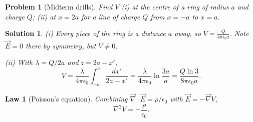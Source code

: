 \documentclass{article}
\newtheorem{law}{Law}
\newtheorem{problem}{Problem}
\newtheorem{solution}{Solution}
\begin{document}
\begin{problem}[Midterm drills]
    Find $V$ (i) at the centre of a ring of radius $a$ and charge $Q$; (ii) at $x = 2a$ for a line of charge $Q$ from $x = -a$ to $x = a$.
\end{problem}
\begin{solution}
    (i) Every piece of the ring is a distance $a$ away, so $V = \frac{Q}{4\pi\epsilon_0 a}$. Note $\vec{E} = 0$ there by symmetry, but $V \neq 0$.\par
    (ii) With $\lambda = Q/2a$ and $\mathfrak{r} = 2a - x'$,
    \[V = \frac{\lambda}{4\pi\epsilon_0}\int_{-a}^{a}\frac{dx'}{2a - x'} = \frac{\lambda}{4\pi\epsilon_0}\ln\frac{3a}{a} = \frac{Q\ln 3}{8\pi\epsilon_0 a}.\]
\end{solution}
\begin{law}[Poisson's equation]
    Combining $\vec{\nabla}\cdot\vec{E} = \rho/\epsilon_0$ with $\vec{E} = -\vec{\nabla}V$,
    \begin{equation}
        \nabla^2 V = -\frac{\rho}{\epsilon_0}.
    \end{equation}
\end{law}
\end{document}
